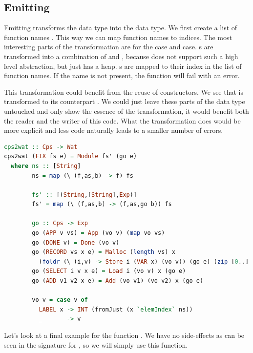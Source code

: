 {\subsection{\label{section:emit}Emitting}
Emitting transforms the  data type into the  data type. We first create a list of function names . This way we can map function names to indices. The most interesting parts of the transformation are for the  case and  case. s are transformed into a combination of  and , because  does not support such a high level abstraction, but just has a heap. s are mapped to their index in the list of function names. If the name is not present, the function will fail with an error.

This transformation could benefit from the reuse of constructors. We see that  is transformed to its  counterpart . We could just leave these parts of the data type untouched and only show the essence of the transformation, it would benefit both the reader and the writer of this code. What the transformation does would be more explicit and less code naturally leads to a smaller number of errors.

\begin{lstlisting}[language=Haskell]
cps2wat :: Cps -> Wat
cps2wat (FIX fs e) = Module fs' (go e)
  where ns :: [String]
        ns = map (\ (f,as,b) -> f) fs

        fs' :: [(String,[String],Exp)]
        fs' = map (\ (f,as,b) -> (f,as,go b)) fs

        go :: Cps -> Exp
        go (APP v vs) = App (vo v) (map vo vs)
        go (DONE v) = Done (vo v)
        go (RECORD vs x e) = Malloc (length vs) x
          (foldr (\ (i,v) -> Store i (VAR x) (vo v)) (go e) (zip [0..] vs))
        go (SELECT i v x e) = Load i (vo v) x (go e)
        go (ADD v1 v2 x e) = Add (vo v1) (vo v2) x (go e)

        vo v = case v of
          LABEL x -> INT (fromJust (x `elemIndex` ns))
          _       -> v
\end{lstlisting}

Let's look at a final example for the function . We have no side-effects as can be seen in the signature for , so we will simply use this function.

}
